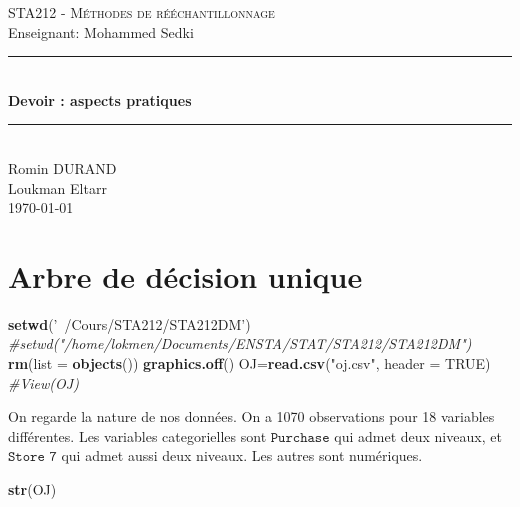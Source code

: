 \documentclass[]{article}
\author{}
\date{\vspace{-2.5em}}
\newenvironment{Shaded}{\begin{snugshade}}{\end{snugshade}}
\newcommand{\CommentTok}[1]{\textcolor[rgb]{0.56,0.35,0.01}{\textit{#1}}}
\newcommand{\DataTypeTok}[1]{\textcolor[rgb]{0.13,0.29,0.53}{#1}}
\newcommand{\KeywordTok}[1]{\textcolor[rgb]{0.13,0.29,0.53}{\textbf{#1}}}
\newcommand{\NormalTok}[1]{#1}
\newcommand{\OtherTok}[1]{\textcolor[rgb]{0.56,0.35,0.01}{#1}}
\newcommand{\StringTok}[1]{\textcolor[rgb]{0.31,0.60,0.02}{#1}}
\begin{document}
\begin{titlepage}
\newcommand{\HRule}{\rule{\linewidth}{0.5mm}}
\center
\textsc{\LARGE
STA212 - Méthodes de rééchantillonnage} \\[2cm]
\LARGE Enseignant: Mohammed Sedki  \\[2cm]

\HRule \\[0.4cm]
{ \huge \bfseries Devoir : aspects pratiques \\[0.15cm] }
\HRule \\[3cm] \LARGE
Romin DURAND \\
Loukman Eltarr
\\[3cm]
\today \\ [1cm]
\end{titlepage}

\hypertarget{arbre-de-duxe9cision-unique}{%
\section{Arbre de décision unique}\label{arbre-de-duxe9cision-unique}}

\begin{Shaded}
\begin{Highlighting}[]
\KeywordTok{setwd}\NormalTok{(}\StringTok{'~/Cours/STA212/STA212DM'}\NormalTok{)}
\CommentTok{#setwd("/home/lokmen/Documents/ENSTA/STAT/STA212/STA212DM")}
\KeywordTok{rm}\NormalTok{(}\DataTypeTok{list =} \KeywordTok{objects}\NormalTok{())}
\KeywordTok{graphics.off}\NormalTok{()}
\NormalTok{OJ=}\KeywordTok{read.csv}\NormalTok{(}\StringTok{"oj.csv"}\NormalTok{, }\DataTypeTok{header =} \OtherTok{TRUE}\NormalTok{)}
\CommentTok{#View(OJ)}
\end{Highlighting}
\end{Shaded}

On regarde la nature de nos données. On a 1070 observations pour 18
variables différentes. Les variables categorielles sont
\(\texttt{Purchase}\) qui admet deux niveaux, et \(\texttt{Store 7}\)
qui admet aussi deux niveaux. Les autres sont numériques.

\begin{Shaded}
\begin{Highlighting}[]
\KeywordTok{str}\NormalTok{(OJ) }
\end{Highlighting}
\end{Shaded}
\end{document}
